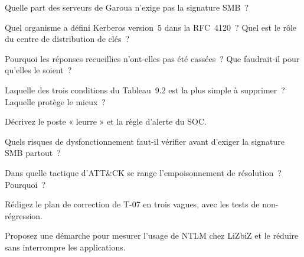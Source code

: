 \begin{boxexo}[title={\ding{45}\quad Exercice~9.2. Proportion \niveaubase}]
Quelle part des serveurs de Garoua n'exige pas la signature SMB~?
\end{boxexo}

\begin{boxexo}[title={\ding{45}\quad Exercice~9.3. Kerberos \niveaubase}]
Quel organisme a défini Kerberos version~5 dans la RFC~4120~? Quel est le
rôle du centre de distribution de clés~?
\end{boxexo}

\begin{boxexo}[title={\ding{45}\quad Exercice~9.4. Casser ou relayer \niveaumoyen}]
Pourquoi les réponses recueillies n'ont-elles pas été cassées~? Que
faudrait-il pour qu'elles le soient~?
\end{boxexo}

\begin{boxexo}[title={\ding{45}\quad Exercice~9.5. Les conditions \niveaumoyen}]
Laquelle des trois conditions du Tableau~9.2 est la plus simple à
supprimer~? Laquelle protège le mieux~?
\end{boxexo}

\begin{boxexo}[title={\ding{45}\quad Exercice~9.6. Le piège \niveaumoyen}]
Décrivez le poste « leurre » et la règle d'alerte du SOC.
\end{boxexo}

\begin{boxexo}[title={\ding{45}\quad Exercice~9.7. Effets de bord \niveaumoyen}]
Quels risques de dysfonctionnement faut-il vérifier avant d'exiger la
signature SMB partout~?
\end{boxexo}

\begin{boxexo}[title={\ding{45}\quad Exercice~9.8. ATT\&CK \niveaumoyen}]
Dans quelle tactique d'ATT\&CK se range l'empoisonnement de résolution~?
Pourquoi~?
\end{boxexo}

\begin{boxexo}[title={\ding{45}\quad Exercice~9.9. Plan de correction \niveauexpert}]
Rédigez le plan de correction de T-07 en trois vagues, avec les tests de
non-régression.
\end{boxexo}

\begin{boxexo}[title={\ding{45}\quad Exercice~9.10. Réduire NTLM \niveauexpert}]
Proposez une démarche pour mesurer l'usage de NTLM chez LiZbiZ et le
réduire sans interrompre les applications.
\end{boxexo}

